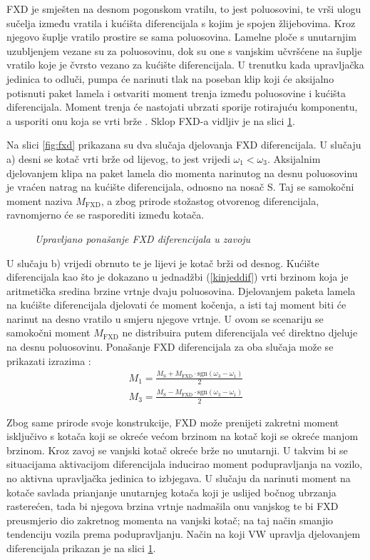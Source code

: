 \documentclass[11pt]{article}
\numberwithin{equation}{section}%
\begin{document}
FXD je smješten na desnom pogonskom vratilu, to jest poluosovini, te vrši ulogu sučelja između vratila i kućišta diferencijala s kojim je spojen žlijebovima. Kroz njegovo šuplje vratilo prostire se sama poluosovina. Lamelne ploče s unutarnjim uzubljenjem vezane su za poluosovinu, dok su one s vanjskim učvršćene na šuplje vratilo koje je čvrsto vezano za kućište diferencijala. U trenutku kada upravljačka jedinica to odluči, pumpa će narinuti tlak na poseban klip koji će aksijalno potisnuti paket lamela i ostvariti moment trenja između poluosovine i kućišta diferencijala. Moment trenja će nastojati ubrzati sporije rotirajuću komponentu, a usporiti onu koja se vrti brže \cite{2023basiclars}. Sklop FXD-a vidljiv je na slici \ref{fig:latslik}.

Na slici \ref{fig:fxd} prikazana su dva slučaja djelovanja FXD diferencijala. U slučaju a) desni se kotač vrti brže od lijevog, to jest vrijedi $\omega_1<\omega_3$. Aksijalnim djelovanjem klipa na paket lamela dio momenta narinutog na desnu poluosovinu je vraćen natrag na kućište diferencijala, odnosno na nosač S. Taj se samokočni moment naziva $M_\text{FXD}$, a zbog prirode stožastog otvorenog diferencijala, ravnomjerno će se rasporediti između kotača.

\begin{figure}
 \centering
 \def\svgwidth{13cm}
 
 \caption{\textit{Upravljano ponašanje FXD diferencijala u zavoju} \cite{2023basiclars}}
 \label{fig:latslik}
\end{figure}  

U slučaju b) vrijedi obrnuto te je lijevi je kotač brži od desnog. Kućište diferencijala kao što je dokazano u jednadžbi (\ref{kinjeddif}) vrti brzinom koja je aritmetička sredina brzine vrtnje dvaju poluosovina. Djelovanjem paketa lamela na kućište diferencijala djelovati će moment kočenja, a isti taj moment biti će narinut na desno vratilo u smjeru njegove vrtnje. U ovom se scenariju se samokočni moment $M_\text{FXD}$ ne distribuira putem diferencijala već direktno djeluje na desnu poluosovinu. Ponašanje FXD diferencijala za oba slučaja može se prikazati izrazima \cite{2023basiclars}:
%
\begin{gather}
M_1=\frac{M_\text{S}+M_\text{FXD}\cdot \text{sgn}(\omega_3-\omega_1)}{2}\\
M_3=\frac{M_\text{S}-M_\text{FXD}\cdot \text{sgn}(\omega_3-\omega_1)}{2}
\end{gather}
%

Zbog same prirode svoje konstrukcije, FXD može prenijeti zakretni moment isključivo s kotača koji se okreće većom brzinom na kotač koji se okreće manjom brzinom. Kroz zavoj se vanjski kotač okreće brže no unutarnji. U takvim bi se situacijama aktivacijom diferencijala inducirao moment podupravljanja na vozilo, no aktivna upravljačka jedinica to izbjegava. U slučaju da narinuti moment na kotače savlada prianjanje unutarnjeg kotača koji je uslijed bočnog ubrzanja rasterećen, tada bi njegova brzina vrtnje nadmašila onu vanjskog te bi FXD preusmjerio dio zakretnog momenta na vanjski kotač; na taj način smanjio tendenciju vozila prema podupravljanju. Način na koji VW upravlja djelovanjem diferencijala prikazan je na slici \ref{fig:latslik}.
\end{document}
